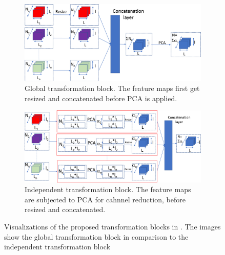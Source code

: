 \begin{figure}[htbp]
    \captionsetup[subfigure]{justification=centering}
    \centering
    \begin{subfigure}[b]{0.3\textwidth} %
        \centering
        \includegraphics[width=\textwidth]{figures/global_transformation_block.jpg}
        \caption{Global transformation block. The feature maps first get resized and concatenated before PCA is applied.}
        \label{fig:GTBheller}
    \end{subfigure}
    \hspace{0.05\textwidth} %
    \begin{subfigure}[b]{0.3\textwidth} %
        \centering
        \includegraphics[width=\textwidth]{figures/independent_transformation_block.jpg}
        \caption{Independent transformation block. The feature maps are subjected to PCA for cahnnel reduction, before resized and concatenated.}
        \label{fig:ITBheller}
    \end{subfigure}
    
    \caption{Visualizations of the proposed transformation blocks in \cite{EnsembleHeller2023}. The images show the global transformation 
             block in comparison to the independent transformation block \cite{EnsembleHeller2023}}
    \label{fig:hellerensembleblocks}
\end{figure}




